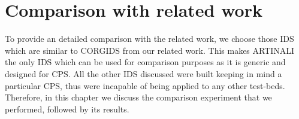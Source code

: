 
\chapter{Comparison with related work}
\label{ch:comparisonwithrelatedwork}

To provide an detailed comparison with the related work, we choose those \ac{IDS} which are similar to \ac{CORGIDS} from our related work. This makes ARTINALI the only \ac{IDS} which can be used for comparison purposes as it is generic and designed for \ac{CPS}. All the other \ac{IDS} discussed were built keeping in mind a particular \ac{CPS}, thus were incapable of being applied to any other test-beds. Therefore, in this chapter we discuss the comparison experiment that we performed, followed by its results.

